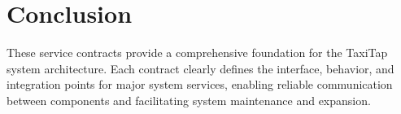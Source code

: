 \documentclass[11pt,a4paper]{article}
\begin{document}
\section{Conclusion}

These service contracts provide a comprehensive foundation for the TaxiTap system architecture. Each contract clearly defines the interface, behavior, and integration points for major system services, enabling reliable communication between components and facilitating system maintenance and expansion.
\end{document}
